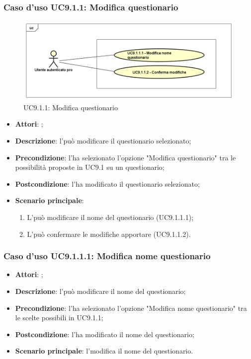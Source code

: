 			\subsubsection{Caso d'uso UC9.1.1: Modifica questionario}
			\label{UC9.1.1}
			\begin{figure}[h]
				\centering
			\includegraphics[scale=0.5,keepaspectratio]{UML/UC9_1_1.png}
				\caption{UC9.1.1: Modifica questionario}
			\end{figure}
			\FloatBarrier
			\begin{itemize}
				\item \textbf{Attori}: \uaupro;
				\item \textbf{Descrizione}: l'\uaupro può modificare il questionario selezionato;
				\item \textbf{Precondizione}: l'\uaupro ha selezionato l'opzione "Modifica questionario" tra le possibilità proposte in UC9.1 su un questionario;
				\item \textbf{Postcondizione}: l'\uaupro ha modificato il questionario selezionato; 
				\item \textbf{Scenario principale}:
					\begin{enumerate}
						\item L'\uaupro può modificare il nome del questionario (UC9.1.1.1);
						\item L'\uaupro può confermare le modifiche apportare (UC9.1.1.2).
					\end{enumerate}
			\end{itemize}
								
					\subsubsection{Caso d'uso UC9.1.1.1: Modifica nome questionario}
					\label{UC9.1.1.1}
					\begin{itemize}
						\item \textbf{Attori}: \uaupro;
						\item \textbf{Descrizione}: l'\uaupro può modificare il nome del questionario; 
						\item \textbf{Precondizione}: l'\uaupro ha selezionato l'opzione "Modifica nome questionario" tra le scelte possibili in UC9.1.1;
						\item \textbf{Postcondizione}: l'\uaupro ha modificato il nome del questionario; 
						\item \textbf{Scenario principale}: l'\uaupro modifica il nome del questionario.
					\end{itemize}
																					
